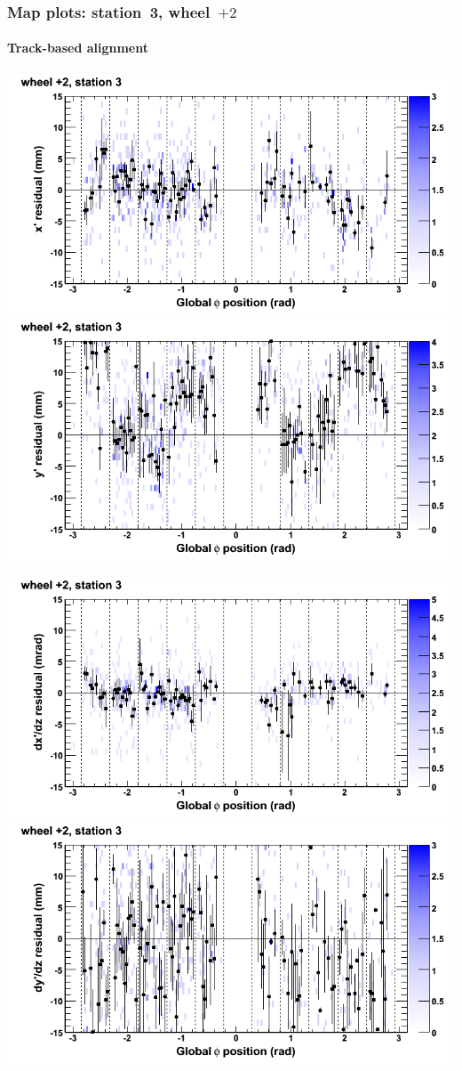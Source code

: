 \documentclass[compress]{beamer}
\begin{document}
\begin{frame}
\frametitle{Map plots: station~3, wheel~$+2$}
\framesubtitle{Track-based alignment}
\includegraphics[width=0.5\linewidth]{mapplots_re05/DTvsphi_st3whE_x.png}
\includegraphics[width=0.5\linewidth]{mapplots_re05/DTvsphi_st3whE_y.png}

\includegraphics[width=0.5\linewidth]{mapplots_re05/DTvsphi_st3whE_dxdz.png}
\includegraphics[width=0.5\linewidth]{mapplots_re05/DTvsphi_st3whE_dydz.png}
\end{frame}
\end{document}
